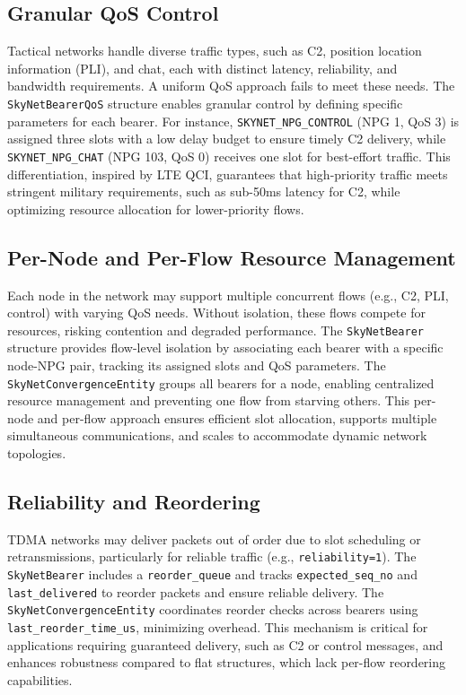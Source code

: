 \documentclass{article}
\begin{document}
\subsection{Granular QoS Control}
Tactical networks handle diverse traffic types, such as C2, position location
information (PLI), and chat, each with distinct latency, reliability,
and bandwidth requirements. A uniform QoS approach fails to meet these needs.
The \texttt{SkyNetBearerQoS} structure enables granular control by defining
specific parameters for each bearer. For instance, \texttt{SKYNET\_NPG\_CONTROL}
(NPG 1, QoS 3) is assigned three slots with a low delay budget to ensure timely
C2 delivery, while \texttt{SKYNET\_NPG\_CHAT} (NPG 103, QoS 0) receives one slot
for best-effort traffic. This differentiation, inspired by LTE QCI, guarantees
that high-priority traffic meets stringent military requirements,
such as sub-50ms latency for C2, while optimizing resource allocation for lower-priority flows.

\subsection{Per-Node and Per-Flow Resource Management}
Each node in the network may support multiple concurrent flows (e.g., C2, PLI, control)
with varying QoS needs. Without isolation, these flows compete for resources,
risking contention and degraded performance. The \texttt{SkyNetBearer}
structure provides flow-level isolation by associating each bearer with
a specific node-NPG pair, tracking its assigned slots and QoS parameters.
The \texttt{SkyNetConvergenceEntity} groups all bearers for a node,
enabling centralized resource management and preventing one flow from starving others.
This per-node and per-flow approach ensures efficient slot allocation,
supports multiple simultaneous communications, and scales to accommodate dynamic network topologies.

\subsection{Reliability and Reordering}
TDMA networks may deliver packets out of order due to slot scheduling
or retransmissions, particularly for reliable traffic (e.g., \texttt{reliability=1}).
The \texttt{SkyNetBearer} includes a \texttt{reorder\_queue} and
tracks \texttt{expected\_seq\_no} and \texttt{last\_delivered} to
reorder packets and ensure reliable delivery. The \texttt{SkyNetConvergenceEntity}
coordinates reorder checks across bearers using \texttt{last\_reorder\_time\_us},
minimizing overhead. This mechanism is critical for applications requiring guaranteed
delivery, such as C2 or control messages, and enhances robustness compared to
flat structures, which lack per-flow reordering capabilities.
\end{document}

